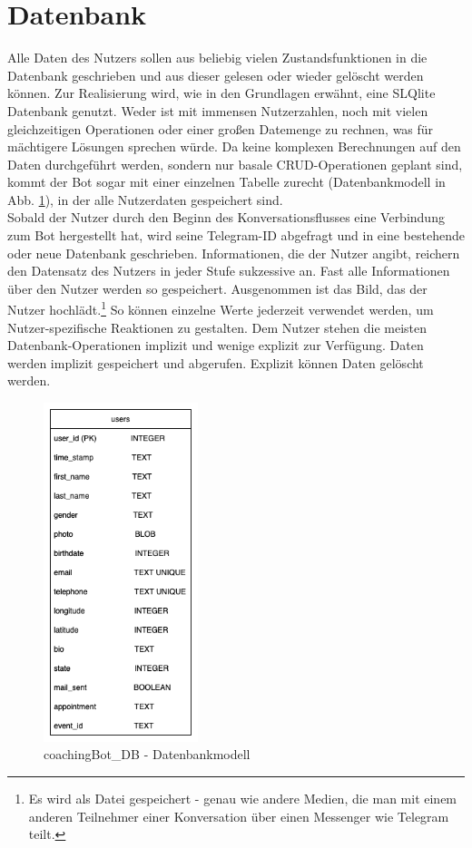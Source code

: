     
    \section{Datenbank} \label{Realisierung: Datenbank}
        Alle Daten des Nutzers sollen aus beliebig vielen Zustandsfunktionen in die Datenbank geschrieben und aus dieser gelesen oder wieder gelöscht werden können. Zur Realisierung wird, wie in den Grundlagen erwähnt, eine SLQlite Datenbank genutzt. Weder ist mit immensen Nutzerzahlen, noch mit vielen gleichzeitigen Operationen oder einer großen Datemenge zu rechnen, was für mächtigere Lösungen sprechen würde. Da keine komplexen Berechnungen auf den Daten durchgeführt werden, sondern nur basale CRUD-Operationen geplant sind, kommt der Bot sogar mit einer einzelnen Tabelle zurecht (Datenbankmodell in Abb. \ref{fig: data base model}), in der alle Nutzerdaten gespeichert sind. \\
        
        Sobald der Nutzer durch den Beginn des Konversationsflusses eine Verbindung zum Bot hergestellt hat, wird seine Telegram-ID abgefragt und in eine bestehende oder neue Datenbank geschrieben. Informationen, die der Nutzer angibt, reichern den Datensatz des Nutzers in jeder Stufe sukzessive an. Fast alle Informationen über den Nutzer werden so gespeichert. Ausgenommen ist das Bild, das der Nutzer hochlädt.\footnote{Es wird als Datei gespeichert - genau wie andere Medien, die man mit einem anderen Teilnehmer einer Konversation über einen Messenger wie Telegram teilt.} So können einzelne Werte jederzeit verwendet werden, um Nutzer-spezifische Reaktionen zu gestalten. Dem Nutzer stehen die meisten Datenbank-Operationen implizit und wenige explizit zur Verfügung. Daten werden implizit gespeichert und abgerufen. Explizit können Daten gelöscht werden. 
        \begin{figure} %
            \centering
            \includegraphics[width=0.4\textwidth]{images/220325_PA28464_DataBaseModel.png}
            \caption{coachingBot\_DB - Datenbankmodell}
            \label{fig: data base model}
        \end{figure}


